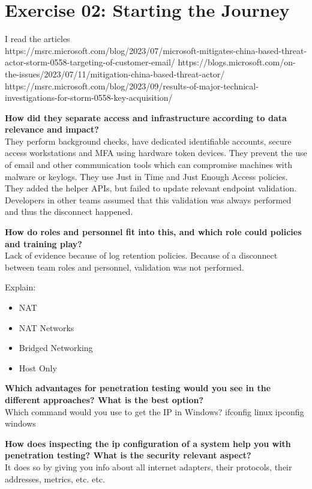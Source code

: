 \section*{Exercise 02: Starting the Journey}
I read the articles\\
https://msrc.microsoft.com/blog/2023/07/microsoft-mitigates-china-based-threat-actor-storm-0558-targeting-of-customer-email/
https://blogs.microsoft.com/on-the-issues/2023/07/11/mitigation-china-based-threat-actor/
https://msrc.microsoft.com/blog/2023/09/results-of-major-technical-investigations-for-storm-0558-key-acquisition/

\textbf{How did they separate access and infrastructure according to data relevance and impact?}\\
They perform background checks, have dedicated identifiable accounts, secure access workstations and MFA using hardware token devices. They prevent the use of email and other communication tools which can compromise machines with malware or keylogs. They use Just in Time and Just Enough Access policies. They added the helper APIs, but failed to update relevant endpoint validation. Developers in other teams assumed that this validation was always performed and thus the disconnect happened.

\textbf{\dag How do roles and personnel fit into this, and which role could policies and training play?}\\
Lack of evidence because of log retention policies. Because of a disconnect between team roles and personnel, validation was not performed.

Explain:
\begin{itemize}
    \item NAT
    \item NAT Networks
    \item Bridged Networking
    \item Host Only
\end{itemize}

\textbf{\dag Which advantages for penetration testing would you see in the different approaches? What is the best option?}\\
Which command would you use to get the IP in Windows?
ifconfig linux
ipconfig windows

\textbf{\dag How does inspecting the ip configuration of a system help you with penetration testing? What is the security relevant aspect?}\\
It does so by giving you info about all internet adapters, their protocols, their addresses, metrics, etc. etc.

